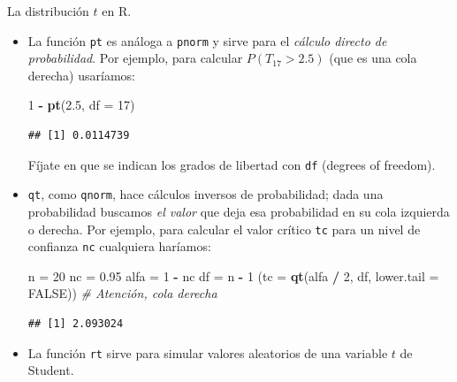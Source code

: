\documentclass[
  9pt,
  ignorenonframetext,
]{beamer}
\newenvironment{Shaded}{\begin{snugshade}}{\end{snugshade}}
\newcommand{\CommentTok}[1]{\textcolor[rgb]{0.56,0.35,0.01}{\textit{#1}}}
\newcommand{\DataTypeTok}[1]{\textcolor[rgb]{0.13,0.29,0.53}{#1}}
\newcommand{\DecValTok}[1]{\textcolor[rgb]{0.00,0.00,0.81}{#1}}
\newcommand{\FloatTok}[1]{\textcolor[rgb]{0.00,0.00,0.81}{#1}}
\newcommand{\KeywordTok}[1]{\textcolor[rgb]{0.13,0.29,0.53}{\textbf{#1}}}
\newcommand{\NormalTok}[1]{#1}
\newcommand{\OperatorTok}[1]{\textcolor[rgb]{0.81,0.36,0.00}{\textbf{#1}}}
\newcommand{\OtherTok}[1]{\textcolor[rgb]{0.56,0.35,0.01}{#1}}
\newcommand{\StringTok}[1]{\textcolor[rgb]{0.31,0.60,0.02}{#1}}
\begin{document}
\begin{frame}[fragile]{La distribución \(t\) en R.}
\protect\hypertarget{la-distribucion-t-en-r.}{}

\begin{itemize}
\item
  La función \texttt{pt} es análoga a \texttt{pnorm} y sirve para el
  \emph{cálculo directo de probabilidad}. Por ejemplo, para calcular
  \(P(T_{17} > 2.5)\) (que es una cola derecha) usaríamos: \small

\begin{Shaded}
\begin{Highlighting}[]
\DecValTok{1} \OperatorTok{-}\StringTok{ }\KeywordTok{pt}\NormalTok{(}\FloatTok{2.5}\NormalTok{, }\DataTypeTok{df =} \DecValTok{17}\NormalTok{)}
\end{Highlighting}
\end{Shaded}

\begin{verbatim}
## [1] 0.0114739
\end{verbatim}

  \normalsize Fíjate en que se indican los grados de libertad con
  \texttt{df} (degrees of freedom).
\item
  \texttt{qt}, como \texttt{qnorm}, hace cálculos inversos de
  probabilidad; dada una probabilidad buscamos \emph{el valor} que deja
  esa probabilidad en su cola izquierda o derecha. Por ejemplo, para
  calcular el valor crítico \texttt{tc} para un nivel de confianza
  \texttt{nc} cualquiera haríamos:\small

\begin{Shaded}
\begin{Highlighting}[]
\NormalTok{n =}\StringTok{ }\DecValTok{20}
\NormalTok{nc =}\StringTok{ }\FloatTok{0.95}
\NormalTok{alfa =}\StringTok{ }\DecValTok{1} \OperatorTok{-}\StringTok{ }\NormalTok{nc}
\NormalTok{df =}\StringTok{ }\NormalTok{n }\OperatorTok{-}\StringTok{ }\DecValTok{1}
\NormalTok{(}\DataTypeTok{tc =} \KeywordTok{qt}\NormalTok{(alfa }\OperatorTok{/}\StringTok{ }\DecValTok{2}\NormalTok{, df, }\DataTypeTok{lower.tail =} \OtherTok{FALSE}\NormalTok{)) }\CommentTok{# Atención, cola derecha}
\end{Highlighting}
\end{Shaded}

\begin{verbatim}
## [1] 2.093024
\end{verbatim}

  \normalsize
\item
  La función \texttt{rt} sirve para simular valores aleatorios de una
  variable \(t\) de Student. \small


\end{itemize}
\end{frame}
\end{document}
